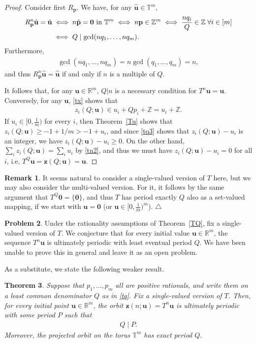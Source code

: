 \documentclass[11pt,reqno,tbtags,a4paper]{amsart}
\numberwithin{equation}{section}
\renewcommand\ge{\geq}
\renewcommand\geq{\geqslant}
\theoremstyle{plain}%
\newtheorem{theorem}{Theorem}[section]
\theoremstyle{definition}
\newcommand\xqed[1]{%
    \leavevmode\unskip\penalty9999 \hbox{}\nobreak\hfill
    \quad\hbox{#1}}
\newtheorem{remarkqqq}[theorem]{Remark}
\newenvironment{remark}{\begin{remarkqqq}}
  {\xqed{$\triangle$}\end{remarkqqq}}
\newtheorem{problem}[theorem]{Problem}
\theoremstyle{remark}
\newcommand{\refT}[1]{Theorem~\ref{#1}}
\newcommand\set[1]{\ensuremath{\{#1\}}}
\newcommand\punkt{\xperiod}    %
\newcommand\ie{i.e\punkt}
\newcommand\bbR{\mathbb R}
\newcommand\bbT{\mathbb T}
\newcommand\bbZ{\mathbb Z}
\newcommand\vp{\mathbf{p}}
\newcommand\hvp{\hat{\mathbf{p}}}
\newcommand\vu{\mathbf{u}}
\newcommand\hvu{{\hat{\mathbf{u}}}}
\newcommand\vz{\mathbf{z}}
\newcommand\Rp{R_\vp}
\newcommand\0{{\boldsymbol 0}}
\newcommand\1{{\boldsymbol 1}}
\begin{document}
\begin{proof}
  Consider first $\Rp$. We have, for any $\hvu\in\bbT^m$,
  \begin{align}\label{tq1}
 \Rp^n\hvu=\hvu
&\iff n\hvp =\0\text{ in }\bbT^m
\iff n\vp\in\bbZ^m
\iff \frac{nq_i}{Q}\in\bbZ\;\forall i\in[m]
\notag\\&
\iff
Q\mid\gcd(nq_1,\dots,nq_m)
.  \end{align}
Furthermore,
\begin{align}\label{tq2}
  \gcd(nq_1,\dots,nq_m)=n\gcd(q_1,\dots,q_m)=n,
\end{align}
and thus $\Rp^n\hvu=\hvu$ if and only if $n$ is a multiple of $Q$.

It follows that, for any $\vu\in\bbR^m$, 
$Q|n$ is a necessary condition for $T^n\vu=\vu$. 
Conversely, for any $\vu$, \eqref{tx} shows that
\begin{align}\label{tq3}
  z_i(Q;\vu)\in u_i + Qp_i + \bbZ = u_i+\bbZ.
\end{align}
If $u_i\in[0,\frac{1}m)$ for every $i$, then
\refT{Tu} shows that $z_i(Q;\vu)\ge -1+1/m>-1+u_i$, and since \eqref{tq3} shows
that
$z_i(Q;\vu)-u_i$ is an integer, we have $z_i(Q;\vu)- u_i\ge0$.
On the other hand, $\sum_i z_i(Q;\vu)=\sum_i u_i$ by \eqref{tn2}, and thus
we must have $z_i(Q;\vu)- u_i=0$ for all $i$, \ie, $T^Q\vu=\vz(Q;\vu)=\vu$.
\end{proof}

\begin{remark}\label{RQ}
  It seems natural to consider a single-valued version of $T$ here, but we may
also consider the multi-valued version. 
For it, it follows by the same argument that 
$T^Q\0=\set\0$, and thus $T$ has period exactly $Q$ also as a set-valued
mapping, if we start with $\vu=\0$ (or $\vu\in[0,\frac{1}m)^m$).
\end{remark}


\begin{problem}\label{PQ}
Under the rationality assumptions of \refT{TQ}, fix a single-valued version
of $T$. We conjecture that for every initial value $\vu\in\bbR^m$, the
sequence $T^n\vu$ is ultimately periodic with least eventual period $Q$.
We have been unable to prove this in general and leave it as an open problem.
\end{problem}

As a substitute,
we state  the following weaker result. 


\begin{theorem}
  Suppose that $p_1,\dots,p_m$ all are positive rationals, and write
  them on a least common denominator $Q$ as in \eqref{tq}.
Fix a single-valued version of $T$.
Then, for every initial point $\vu\in\bbR^m$, 
the orbit
$\vz(n;\vu)=T^n\vu$ is ultimately periodic with some period $P$ such that
\begin{align}\label{fq1}
Q\mid P.
\end{align}
Moreover, the projected orbit on the torus $\bbT^m$ has exact period $Q$.
\end{theorem}
\end{document}
